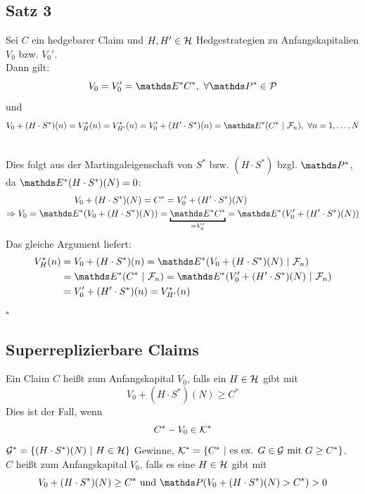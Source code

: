 \subsection{Satz 3}
\label{sub:satz_3}
Sei $C$ ein hedgebarer Claim und $H,H'\in \mathcal{H}$ Hedgestrategien zu Anfangskapitalien $V_0$ bzw. $V_0'$.\\
Dann gilt:
\[
V_0=V_0'=\E^*C^*,~\forall \Pw^*\in\mc{P}
\]
und
\[
V_0+(H\cdot S^*)(n)=V_H^*(n)=V_{H'}^*(n)=V_0'+(H'\cdot S^*)(n)=\E^*(C^*~|~\F_n),~\forall n=1,\dots,N
\]

\\
Dies folgt aus der Martingaleigenschaft von $S^*$ bzw. $(H\cdot S^*)$ bzgl. $\Pw^*$, da $\E^*(H\cdot S^*)(N)=0$:
\begin{equation*}
\begin{aligned}
	V_0&+(H\cdot S^*)(N)=C^*=V_0'+(H'\cdot S^*)(N)\\
	\Rightarrow V_0=\E^*&(V_0+(H\cdot S^*)(N))=\underbracket{\E^*C^*}_{=V_0'}=\E^*(V_0'+(H'\cdot S^*)(N))
\end{aligned}
\end{equation*} 
Das gleiche Argument liefert:
\begin{equation*}
\begin{aligned}
	V_H^*(n) &= V_0+(H\cdot S^*)(n)=\E^*(V_0+(H\cdot S^*)(N)~|~\F_n)\\
	&= \E^*(C^*~|~\F_n)=\E^*(V_0'+(H'\cdot S^*)(N)~|~\F_n)\\
	&= V_0'+(H'\cdot S^*)(n)= V_{H'}^*(n)
\end{aligned}
\end{equation*}
\hfill $\square$

\subsection{Superreplizierbare Claims}
\label{sub:superrepl_claims}
Ein Claim $C$ heißt  zum Anfangskapital $V_0$, falls ein $H\in\mathcal{H}$ gibt mit
\[
V_0+(H\cdot S^*)(N)\ge C^*
\]
Dies ist der Fall, wenn
\[
C^*-V_0\in \mathcal{K}^*
\]
$\mathcal{G}^*=\{(H\cdot S^*)(N)~|~H\in\mathcal{H}\}$ Gewinne, $\mathcal{K}^*=\{C^*~|~\text{es ex. }G\in\mathcal{G}\text{ mit }G\ge C^* \}$.\\
$C$ heißt  zum Anfangskapital $V_0$, falls es eine $H\in \mathcal{H}$ gibt mit
\[
V_0+(H\cdot S^*)(N)\ge C^*\text{ und }\Pw(V_0+(H\cdot S^*)(N)>C^*)>0
\]

